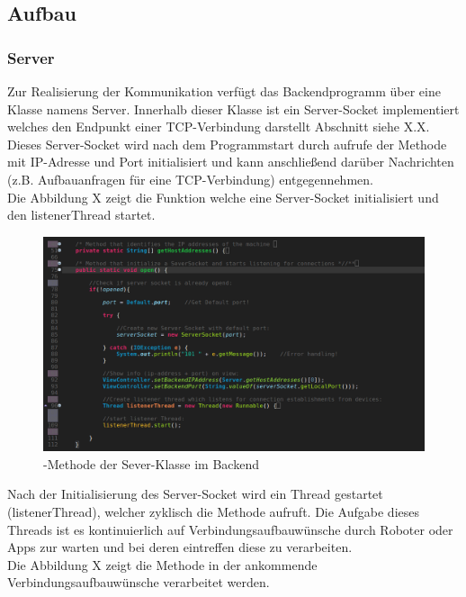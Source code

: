 \subsection{Aufbau}
\subsubsection{Server}
Zur Realisierung der Kommunikation verfügt das Backendprogramm über eine Klasse namens Server. Innerhalb dieser Klasse ist ein
Server-Socket implementiert welches den Endpunkt einer TCP-Verbindung darstellt Abschnitt siehe X.X. Dieses Server-Socket wird
nach dem Programmstart durch aufrufe der Methode  mit IP-Adresse und Port initialisiert und kann anschließend 
darüber Nachrichten (z.B. Aufbauanfragen für eine TCP-Verbindung) entgegennehmen. \\
Die Abbildung X zeigt die Funktion  welche eine Server-Socket initialisiert und den listenerThread startet.
\begin{figure}[ht]
	\centering
	\includegraphics[width=1.0\textwidth]{images/implementation/SeverOpenMethod.png}
	\caption[-Methode der Sever-Klasse im Backend]{-Methode der Sever-Klasse im Backend}
	\label{fig:ev3system}
\end{figure}
Nach der Initialisierung des Server-Socket wird ein Thread gestartet (listenerThread), welcher zyklisch die Methode 
aufruft. Die Aufgabe dieses Threads ist es kontinuierlich auf Verbindungsaufbauwünsche durch Roboter oder Apps zur warten und bei
deren eintreffen diese zu verarbeiten. \\
Die Abbildung X zeigt die Methode  in der ankommende Verbindungsaufbauwünsche verarbeitet werden.
